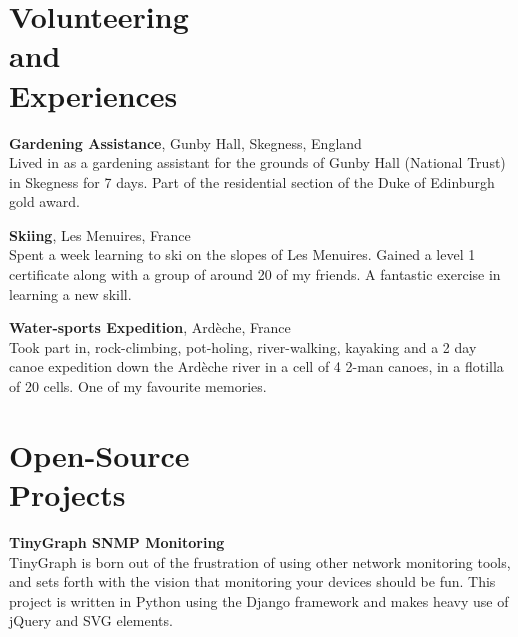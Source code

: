 \documentclass[margin,line]{resume}
\begin{document}
\begin{resume}
    \section{\mysidestyle Volunteering\\and\\Experiences}
    
    \textbf{Gardening Assistance}, Gunby Hall, Skegness, England \vspace{2mm}\\\vspace{1mm}%
    Lived in as a gardening assistant for the grounds of Gunby Hall (National Trust) in Skegness for 7 days.
    Part of the residential section of the Duke of Edinburgh gold award.
    
    \textbf{Skiing}, Les Menuires, France \vspace{2mm}\\\vspace{1mm}%
    Spent a week learning to ski on the slopes of Les Menuires. Gained a level 1 certificate along with a group of around 20 of my friends.
    A fantastic exercise in learning a new skill.
    
    \textbf{Water-sports Expedition}, Ard\`eche, France \vspace{2mm}\\\vspace{1mm}%
    Took part in, rock-climbing, pot-holing, river-walking, kayaking and a 2 day canoe expedition down the Ard\`eche
    river in a cell of 4 2-man canoes, in a flotilla of 20 cells. One of my favourite memories.
	
    \section{\mysidestyle Open-Source\\Projects}

    \textbf{TinyGraph SNMP Monitoring}\vspace{1mm}\\%
    TinyGraph is born out of the frustration of using other network monitoring tools, and sets forth with the vision that monitoring your devices should be fun. This project is written in Python using the Django framework and makes heavy use of jQuery and SVG elements.
    \vspace{-1.5mm}
    

\end{resume}
\end{document}

